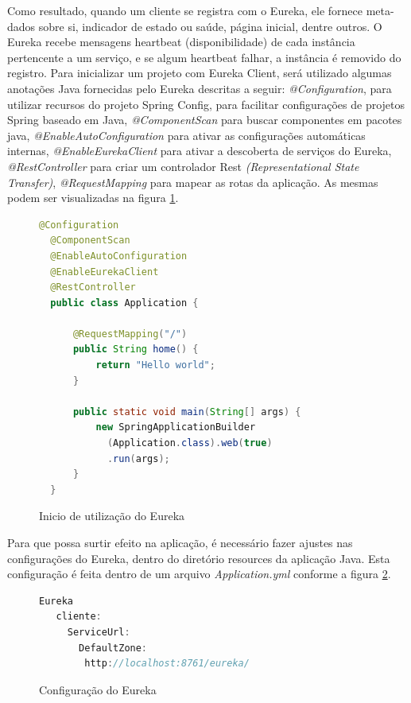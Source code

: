 \documentclass[journal]{IEEEtran}
\begin{document}
Como resultado, quando um cliente se registra com o Eureka, ele fornece meta-dados sobre si, indicador de estado ou saúde, página inicial, dentre outros. O Eureka recebe mensagens heartbeat (disponibilidade) de cada instância pertencente a um serviço, e se algum heartbeat falhar, a instância é removido do registro.
Para inicializar um projeto com Eureka Client, será utilizado algumas anotações Java fornecidas pelo Eureka descritas a seguir: \emph{@Configuration}, para utilizar recursos do projeto Spring Config, para facilitar configurações de projetos Spring baseado em Java, \emph{@ComponentScan} para buscar componentes em pacotes java, \emph{@EnableAutoConfiguration} para ativar as configurações automáticas internas, \emph{@EnableEurekaClient} para ativar a descoberta de serviços do Eureka, \emph{@RestController} para criar um controlador Rest \emph{(Representational State Transfer)}, \emph{@RequestMapping} para mapear as rotas da aplicação. As mesmas podem ser visualizadas na figura \ref{alg:eurekainicio}.

\begin{figure}[h]
\centering

\begin{lstlisting}[language=Java]
  @Configuration
  @ComponentScan
  @EnableAutoConfiguration
  @EnableEurekaClient
  @RestController
  public class Application {

      @RequestMapping("/")
      public String home() {
          return "Hello world";
      }

      public static void main(String[] args) {
          new SpringApplicationBuilder
            (Application.class).web(true)
            .run(args);
      }
  }
\end{lstlisting}

\caption{Inicio de utilização do Eureka}
\label{alg:eurekainicio}
\end{figure}

Para que possa surtir efeito na aplicação, é necessário fazer ajustes nas configurações do Eureka, dentro do diretório resources da aplicação Java. Esta configuração é feita dentro de um arquivo \emph{Application.yml} conforme a figura \ref{alg:configeureka}.

\begin{figure}[h]
\centering

\begin{lstlisting}[language=Java]
  Eureka
   cliente:
     ServiceUrl:
       DefaultZone: 
        http://localhost:8761/eureka/ 
\end{lstlisting}

\caption{Configuração do Eureka}
\label{alg:configeureka}
\end{figure}
\end{document}
